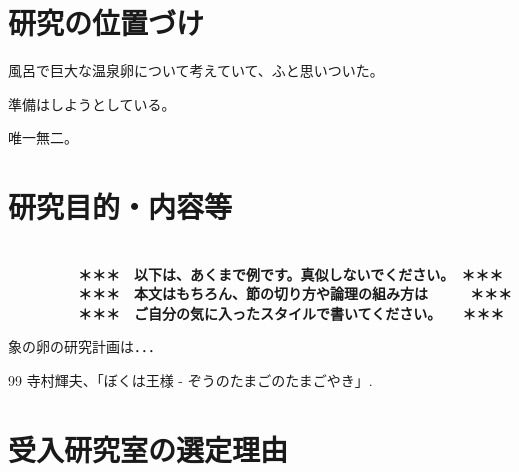 \documentclass[11pt,a4j,dvipdfmx]{jarticle} 					%
\newcommand{\研究課題名}{象の卵}
\newcommand{\研究機関名}{逢坂大学}
\newcommand{\研究代表者氏名}{湯川秀樹}
\begin{document}

\section{研究の位置づけ}

		風呂で巨大な温泉卵について考えていて、ふと思いついた。

	準備はしようとしている。

	唯一無二。




\section{研究目的・内容等}

\JSPSInstructions	%

\textbf{\\　　　　　＊＊＊　以下は、あくまで例です。真似しないでください。　＊＊＊\\
　　　　　＊＊＊　本文はもちろん、節の切り方や論理の組み方は　　　＊＊＊\\
　　　　　＊＊＊　ご自分の気に入ったスタイルで書いてください。　　＊＊＊}

	象の卵の研究計画は．．．

	\vspace{1cm}
	\begin{thebibliography}{99}
		 寺村輝夫、「ぼくは王様 - ぞうのたまごのたまごやき」.
	\end{thebibliography}



\section{受入研究室の選定理由}
\end{document}
